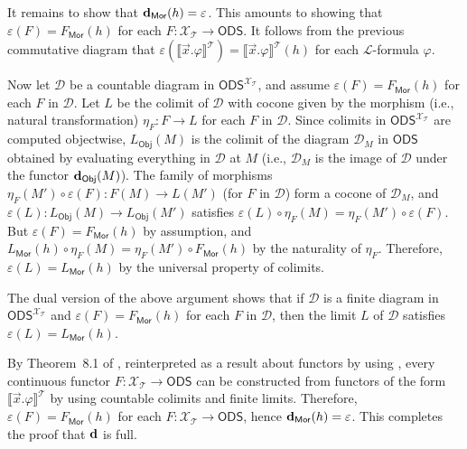 \documentclass{article}
\theoremstyle{plain}
\def\cal#1{{\mathcal #1}}
\def\calD{{\cal D}}
\def\calL{{\cal L}}
\def\calT{{\cal T}}
\def\calX{{\cal X}}
\newcommand{\ODS}{{\mathsf{ODS}}}
\newcommand{\y}{{\mathsf{\bf d}}}
\newcommand{\Mor}{\mathsf{Mor}}
\newcommand{\Obj}{\mathsf{Obj}}
\begin{document}
It remains to show that $\y_\Mor(h)=\varepsilon$. This amounts to showing that $\varepsilon(F)=F_\Mor(h)$ for each $F\colon \calX_\calT\to\ODS$. It follows from the previous commutative diagram that $\varepsilon(\llbracket \vec{x}.\varphi\rrbracket^\calT) = \llbracket \vec{x}.\varphi\rrbracket^\calT(h)$ for each $\calL$-formula $\varphi$.

Now let $\calD$ be a countable diagram in $\ODS^{\calX_\calT}$, and assume $\varepsilon(F)=F_\Mor(h)$ for each $F$ in $\calD$. Let $L$ be the colimit of $\calD$ with cocone given by the morphism (i.e., natural transformation) $\eta_F \colon F\to L$ for each $F$ in $\calD$. Since colimits in $\ODS^{\calX_\calT}$ are computed objectwise, $L_\Obj(M)$ is the colimit of the diagram $\calD_M$ in $\ODS$ obtained by evaluating everything in $\calD$ at $M$ (i.e., $\calD_M$ is the image of $\calD$ under the functor $\y_\Obj(M)$). The family of morphisms $\eta_F(M')\circ \varepsilon(F) \colon F(M) \to L(M')$ (for $F$ in $\calD$) form a cocone of $\calD_M$, and $\varepsilon(L)\colon L_\Obj(M)\to L_\Obj(M')$ satisfies $\varepsilon(L)\circ \eta_F(M) = \eta_F(M')\circ\varepsilon(F)$. But $\varepsilon(F)=F_\Mor(h)$ by assumption, and $L_\Mor(h)\circ \eta_F(M) = \eta_F(M')\circ F_\Mor(h)$ by the naturality of $\eta_F$. Therefore, $\varepsilon(L)=L_\Mor(h)$ by the universal property of colimits.


The dual version of the above argument shows that if $\calD$ is a finite diagram in $\ODS^{\calX_\calT}$ and $\varepsilon(F)=F_\Mor(h)$ for each $F$ in $\calD$, then the limit $L$ of $\calD$ satisfies $\varepsilon(L)=L_\Mor(h)$.

By Theorem~8.1 of \cite{Chen19}, reinterpreted as a result about functors by using \cite{dbr26}, every continuous functor $F\colon \calX_\calT \to\ODS$ can be constructed from functors of the form $\llbracket \vec{x}.\varphi\rrbracket^\calT$ by using countable colimits and finite limits. Therefore, $\varepsilon(F)=F_\Mor(h)$ for each $F\colon \calX_\calT\to\ODS$, hence $\y_\Mor(h)=\varepsilon$. This completes the proof that $\y$ is full.
\end{document}
